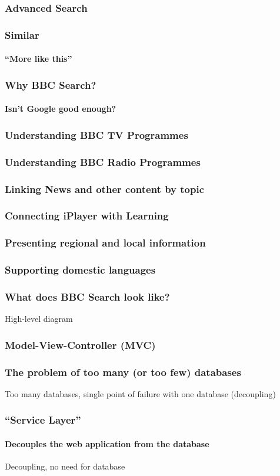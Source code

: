 \documentclass{beamer}
\begin{document}
\begin{frame}
  \frametitle{Advanced Search}
\end{frame}

\begin{frame}
  \frametitle{Similar}
  \framesubtitle{``More like this''}
\end{frame}

\begin{frame}
  \frametitle{Why BBC Search?}
  \framesubtitle{Isn't Google good enough?}
\end{frame}

\begin{frame}
  \frametitle{Understanding BBC TV Programmes}
\end{frame}

\begin{frame}
  \frametitle{Understanding BBC Radio Programmes}
\end{frame}

\begin{frame}
  \frametitle{Linking News and other content by topic}
\end{frame}

\begin{frame}
  \frametitle{Connecting iPlayer with Learning}
\end{frame}

\begin{frame}
  \frametitle{Presenting regional and local information}
\end{frame}

\begin{frame}
  \frametitle{Supporting domestic languages}
\end{frame}

\begin{frame}
  \frametitle{What does BBC Search look like?}
  High-level diagram
\end{frame}

\begin{frame}
  \frametitle{Model-View-Controller (MVC)}
\end{frame}

\begin{frame}
  \frametitle{The problem of too many (or too few) databases}
  Too many databases, single point of failure with one database (decoupling)
\end{frame}

\begin{frame}
  \frametitle{``Service Layer''}
  \framesubtitle{Decouples the web application from the database}
  Decoupling, no need for database
\end{frame}
\end{document}
